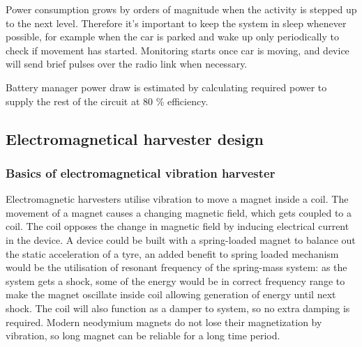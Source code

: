 \begin{table}[htb]
\caption{\label{power_consumption_table} Current and power consumption of system at different activity levels.}
\begin{center}
\end{center}
\end{table}

Power consumption grows by orders of magnitude when the activity is stepped up to the next level. Therefore it's important to keep the system in sleep whenever possible, for example when the car is parked and wake up only periodically to check if movement has started. Monitoring starts once car is moving, and device will send brief pulses over the radio link when necessary.

Battery manager power draw is estimated by calculating required power to supply the rest of the circuit at 80 \% efficiency.


\subsection{Electromagnetical harvester design}
\subsubsection{Basics of electromagnetical vibration harvester}
Electromagnetic harvesters utilise vibration to move a magnet inside a coil. The movement of a magnet causes a changing magnetic field, which gets coupled to a coil. The coil opposes the change in magnetic field by inducing electrical current in the device. A device could be built with a spring-loaded magnet to balance out the static acceleration of a tyre, an added benefit to spring loaded mechanism would be the utilisation of resonant frequency of the spring-mass system: as the system gets a shock, some of the energy would be in correct frequency range to make the magnet oscillate inside coil allowing generation of energy until next shock. The coil will also function as a damper to system, so no extra damping is required. Modern neodymium magnets do not lose their magnetization by vibration, so long magnet can be reliable for a long time period. 

